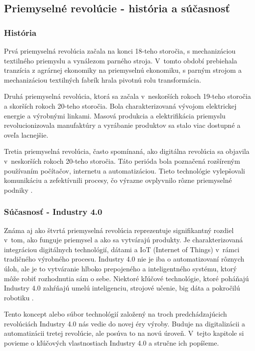 \subsection{Priemyselné revolúcie - história a súčasnosť}

\subsubsection{História}

Prvá priemyselná  revolúcia začala na konci 18-teho storočia, s mechanizáciou textilného priemyslu a vynálezom parného stroja. V~tomto období prebiehala tranzícia z agrárnej ekonomiky na priemyselnú ekonomiku, s parným strojom a mechanizáciou textilných fabrík hrala pivotnú rolu transformácia.

Druhá priemyselná revolúcia, ktorá sa začala v~neskorších rokoch 19-teho storočia a skorších rokoch 20-teho storočia. Bola charakterizovaná vývojom elektrickej energie a výrobnými linkami. Masová produkcia a elektrifikácia priemyslu revolucionizovala manufaktúry a vyrábanie produktov sa stalo viac dostupné a oveľa lacnejšie.

Tretia priemyselná revolúcia, často spomínaná, ako digitálna revolúcia sa objavila v~neskorších rokoch 20-teho storočia. Táto perióda bola poznačená rozšíreným používaním počítačov, internetu a automatizáciou. Tieto technológie vylepšovali komunikáciu a zefektívnili procesy, čo výrazne ovplyvnilo rôzne priemyselné podniky \cite{rajan2023industry40}. 

\subsubsection{Súčasnosť - Industry 4.0}

Známa aj ako štvrtá priemyselná revolúcia reprezentuje signifikantný rozdiel v~tom, ako funguje priemysel a ako sa vytvárajú produkty. Je charakterizovaná integráciou digitálnych technológií, dátami a IoT (Internet of Things) v~rámci tradičného výrobného procesu. Industry 4.0 nie je iba o automatizovaní rôznych úloh, ale je to vytváranie hlboko prepojeného a inteligentného systému, ktorý môže robiť rozhodnutia sám o sebe. Niektoré kľúčové technológie, ktoré poháňajú Industry 4.0 zahŕňajú umelú inteligenciu, strojové učenie, big dáta a pokročilú robotiku \cite{rajan2023industry40}. 

Tento koncept alebo súbor technológií založený na troch predchádzajúcich revolúciách Industry 4.0 nás vedie do novej éry výroby. Buduje na digitalizácii a automatizácii tretej revolúcie, ale posúva to na novú úroveň. V~tejto kapitole si povieme o kľúčových vlastnostiach Industry 4.0 a stručne ich popíšeme.


